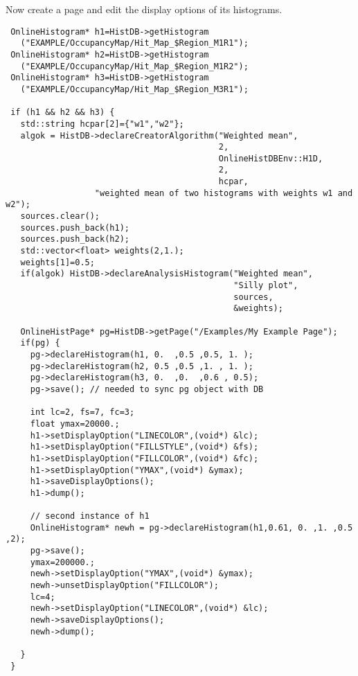 \documentclass{lhcbnote}
\begin{document}
Now create a page and edit the display options of its
histograms. 
\begin{verbatim}
 OnlineHistogram* h1=HistDB->getHistogram
   ("EXAMPLE/OccupancyMap/Hit_Map_$Region_M1R1");
 OnlineHistogram* h2=HistDB->getHistogram
   ("EXAMPLE/OccupancyMap/Hit_Map_$Region_M1R2");
 OnlineHistogram* h3=HistDB->getHistogram
   ("EXAMPLE/OccupancyMap/Hit_Map_$Region_M3R1");

 if (h1 && h2 && h3) {
   std::string hcpar[2]={"w1","w2"};
   algok = HistDB->declareCreatorAlgorithm("Weighted mean",
                                           2,
                                           OnlineHistDBEnv::H1D,
                                           2,
                                           hcpar,
                  "weighted mean of two histograms with weights w1 and w2");
   sources.clear();
   sources.push_back(h1);
   sources.push_back(h2);
   std::vector<float> weights(2,1.);
   weights[1]=0.5;
   if(algok) HistDB->declareAnalysisHistogram("Weighted mean",
                                              "Silly plot",
                                              sources,
                                              &weights);

   OnlineHistPage* pg=HistDB->getPage("/Examples/My Example Page");
   if(pg) {
     pg->declareHistogram(h1, 0.  ,0.5 ,0.5, 1. ); 
     pg->declareHistogram(h2, 0.5 ,0.5 ,1. , 1. ); 
     pg->declareHistogram(h3, 0.  ,0.  ,0.6 , 0.5);
     pg->save(); // needed to sync pg object with DB
   
     int lc=2, fs=7, fc=3;
     float ymax=20000.;
     h1->setDisplayOption("LINECOLOR",(void*) &lc);
     h1->setDisplayOption("FILLSTYLE",(void*) &fs);
     h1->setDisplayOption("FILLCOLOR",(void*) &fc); 
     h1->setDisplayOption("YMAX",(void*) &ymax); 
     h1->saveDisplayOptions();
     h1->dump();

     // second instance of h1
     OnlineHistogram* newh = pg->declareHistogram(h1,0.61, 0. ,1. ,0.5 ,2);
     pg->save();
     ymax=200000.;
     newh->setDisplayOption("YMAX",(void*) &ymax); 
     newh->unsetDisplayOption("FILLCOLOR");
     lc=4;
     newh->setDisplayOption("LINECOLOR",(void*) &lc);
     newh->saveDisplayOptions();
     newh->dump();

   }
 }
\end{verbatim}
\end{document}

